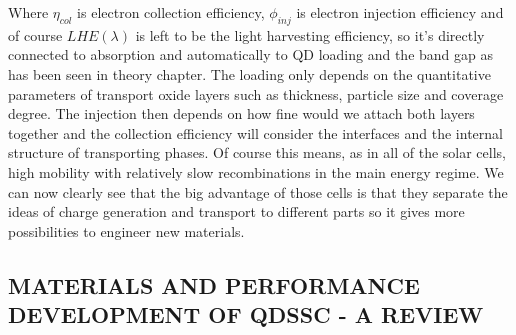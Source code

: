 Where $\eta_{col}$ is electron collection efficiency, $\phi_{inj}$ is electron injection efficiency and of course $LHE(\lambda )$ is left to be the light harvesting efficiency, so it's directly connected to absorption and automatically to QD loading and the band gap as has been seen in theory chapter. The loading only depends on the quantitative parameters of transport oxide layers such as thickness, particle size and coverage degree. The injection then depends on how fine would we attach both layers together and the collection efficiency will consider the interfaces and the internal structure of transporting phases. Of course this means, as in all of the solar cells, high mobility with relatively slow recombinations in the main energy regime. We can now clearly see that the big advantage of those cells is that they separate the ideas of charge generation and transport to different parts so it gives more possibilities to engineer new materials. 
\cite{HuashangRao2018} \cite{Wu2014}

\subsection{MATERIALS AND PERFORMANCE DEVELOPMENT OF QDSSC - A REVIEW}

